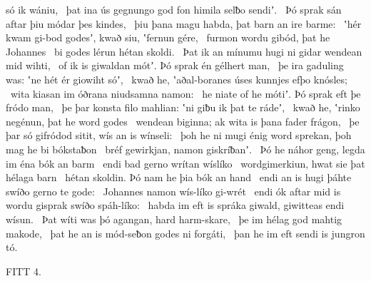 só ik wániu, \hld\ þat ina ús gegnungo god fon himila
selƀo sendiʼ. \hld\ Þó sprak sán aftar
þiu módar þes kindes, \hld\ þiu þana magu habda,
þat barn an ire barme: \hld\ ʽhér kwam gi-bod godesʼ, kwað siu,
ʽfernun gére, \hld\ furmon wordu
gibód, þat he Johannes \hld\ bi godes lérun
hétan skoldi. \hld\ Þat ik an mínumu hugi ni gidar
wendean mid wihti, \hld\ of ik is giwaldan mótʼ.
Þó sprak én gélhert man, \hld\ þe ira gaduling was:
ʽne hét ér giowiht sóʼ, \hld\ kwað he, ʽaðal-boranes
úses kunnjes efþo knósles; \hld\ wita kiasan im óðrana
niudsamna namon: \hld\ he niate of he mótiʼ.
Þó sprak eft þe fródo man, \hld\ þe þar konsta filo mahlian:
ʽni giƀu ik þat te rádeʼ, \hld\ kwað he, ʽrinko negénun,
þat he word godes \hld\ wendean biginna;
ak wita is þana fader frágon, \hld\ þe þar só gifródod sitit,
wís an is wínseli: \hld\ þoh he ni mugi énig word sprekan,
þoh mag he bi bókstaƀon \hld\ bréf gewirkjan,
namon giskríƀanʼ. \hld\ Þó he náhor geng,
legda im éna bók an barm \hld\ endi bad gerno
wrítan wíslíko \hld\ wordgimerkiun,
hwat sie þat hélaga barn \hld\ hétan skoldin.
Þó nam he þia bók an hand \hld\ endi an is hugi þáhte
swíðo gerno te gode: \hld\ Johannes namon
wís-líko gi-wrét \hld\ endi ók aftar mid is wordu gisprak
swíðo spáh-líko: \hld\ habda im eft is spráka giwald,
giwitteas endi wísun. \hld\ Þat wíti was þó agangan,
hard harm-skare, \hld\ þe im hélag god
mahtig makode, \hld\ þat he an is mód-seƀon
godes ni forgáti, \hld\ þan he im eft sendi is jungron tó.

FITT 4.

